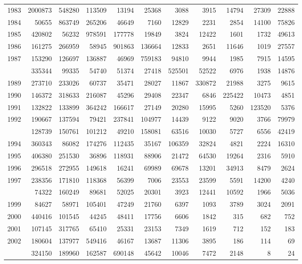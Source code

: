 \documentclass[
]{article}
\begin{document}
\begin{longtable}[t]{lrrrrrrrrrr}
1983 & 2000873 & 548280 & 113509 & 13194 & 25368 & 3088 & 3915 & 14794 & 27309 & 22888\\
1984 & 50655 & 863749 & 265206 & 46649 & 7160 & 12829 & 2231 & 2854 & 14100 & 75826\\
1985 & 420802 & 56232 & 978591 & 177778 & 19849 & 3824 & 12422 & 1601 & 1732 & 49613\\
1986 & 161275 & 266959 & 58945 & 901863 & 136664 & 12833 & 2651 & 11646 & 1019 & 27557\\
1987 & 153290 & 126697 & 136887 & 46969 & 759183 & 94810 & 9944 & 1985 & 7915 & 14595\\
\addlinespace
1988 & 335344 & 99335 & 54740 & 51374 & 27418 & 525501 & 52522 & 6976 & 1938 & 14876\\
1989 & 273710 & 233026 & 60737 & 35471 & 28027 & 11867 & 330872 & 21988 & 3275 & 9615\\
1990 & 146372 & 318633 & 216087 & 45296 & 29408 & 22347 & 6846 & 225422 & 10473 & 4851\\
1991 & 132822 & 133899 & 364242 & 166617 & 27149 & 20280 & 15995 & 5260 & 123520 & 5376\\
1992 & 190667 & 137594 & 79421 & 237841 & 104977 & 14439 & 9122 & 9020 & 3766 & 79979\\
\addlinespace
1993 & 128739 & 150761 & 101212 & 49210 & 158081 & 63516 & 10030 & 5727 & 6556 & 42419\\
1994 & 360343 & 86082 & 174276 & 112435 & 35167 & 106359 & 32824 & 4821 & 2224 & 16310\\
1995 & 406380 & 251530 & 36896 & 118931 & 88906 & 21472 & 64530 & 19264 & 2316 & 5910\\
1996 & 296518 & 272955 & 149618 & 16241 & 69989 & 69678 & 13201 & 34913 & 8479 & 2624\\
1997 & 238356 & 171810 & 118368 & 56399 & 7006 & 23553 & 23599 & 5591 & 14200 & 4240\\
\addlinespace
1998 & 74322 & 160249 & 89681 & 52025 & 20301 & 3923 & 12441 & 10592 & 1966 & 5036\\
1999 & 84627 & 58971 & 105401 & 47249 & 21760 & 6397 & 1093 & 3789 & 3024 & 2091\\
2000 & 440416 & 101545 & 44245 & 48411 & 17756 & 6606 & 1842 & 315 & 682 & 752\\
2001 & 107145 & 317765 & 65410 & 25331 & 23153 & 7349 & 1619 & 712 & 152 & 183\\
2002 & 180604 & 137977 & 549416 & 46167 & 13687 & 11306 & 3895 & 186 & 114 & 69\\
\addlinespace
2003 & 324150 & 189960 & 162587 & 690148 & 45642 & 10046 & 7472 & 2148 & 8 & 24\\

\end{longtable}
\end{document}
